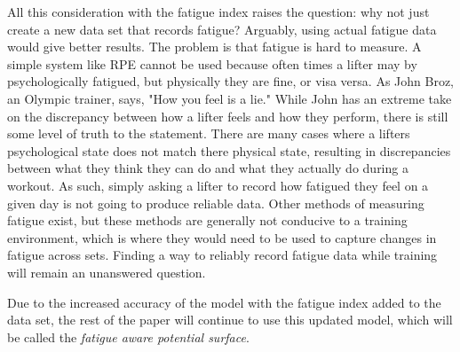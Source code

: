 All this consideration with the fatigue index raises the question: why not just create a new data set that records fatigue? Arguably, using actual fatigue data would give better results. The problem is that fatigue is hard to measure. A simple system like RPE cannot be used because often times a lifter may by psychologically fatigued, but physically they are fine, or visa versa. As John Broz, an Olympic trainer, says, "How you feel is a lie." While John has an extreme take on the discrepancy between how a lifter feels and how they perform, there is still some level of truth to the statement. There are many cases where a lifters psychological state does not match there physical state, resulting in discrepancies between what they think they can do and what they actually do during a workout. As such, simply asking a lifter to record how fatigued they feel on a given day is not going to produce reliable data. Other methods of measuring fatigue exist\cite{MEASURING_FATIGUE}, but these methods are generally not conducive to a training environment, which is where they would need to be used to capture changes in fatigue across sets. Finding a way to reliably record fatigue data while training will remain an unanswered question.

Due to the increased accuracy of the model with the fatigue index added to the data set, the rest of the paper will continue to use this updated model, which will be called the \textit{fatigue aware potential surface}.



